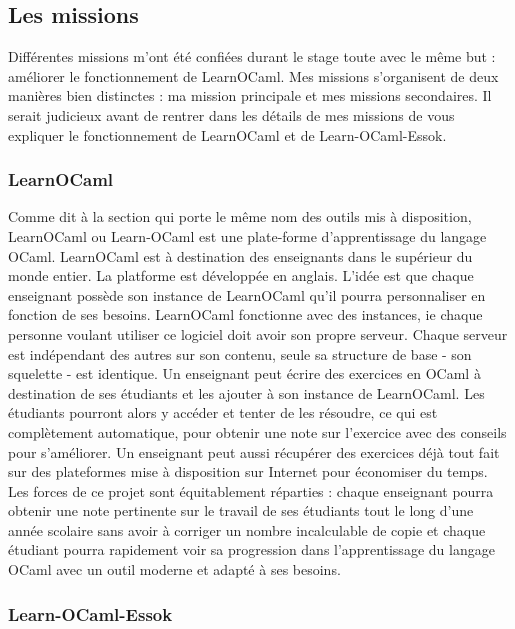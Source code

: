 \documentclass{article}
\begin{document}
\subsection{Les missions}

Différentes missions m'ont été confiées durant le stage toute avec le même but : améliorer le fonctionnement de LearnOCaml.
Mes missions s'organisent de deux manières bien distinctes : ma mission principale et mes missions secondaires.
Il serait judicieux avant de rentrer dans les détails de mes missions de vous expliquer le fonctionnement de LearnOCaml et de Learn-OCaml-Essok.

\subsubsection{LearnOCaml}

Comme dit à la section qui porte le même nom des outils mis à disposition, LearnOCaml ou Learn-OCaml est une plate-forme d’apprentissage du langage OCaml.
LearnOCaml est à destination des enseignants dans le supérieur du monde entier. La platforme est développée en anglais. L'idée est que chaque enseignant possède son instance de LearnOCaml qu'il pourra personnaliser en fonction de ses besoins.
\newline
LearnOCaml fonctionne avec des instances, ie chaque personne voulant utiliser ce logiciel doit avoir son propre serveur. Chaque serveur est indépendant des autres sur son contenu, seule sa structure de base - son squelette - est identique.
\newline
Un enseignant peut écrire des exercices en OCaml à destination de ses étudiants et les ajouter à son instance de LearnOCaml. Les étudiants pourront alors y accéder et tenter de les résoudre, ce qui est complètement automatique, pour obtenir une note sur l'exercice avec des conseils pour s'améliorer.
\newline
Un enseignant peut aussi récupérer des exercices déjà tout fait sur des plateformes mise à disposition sur Internet pour économiser du temps.
\newline
Les forces de ce projet sont équitablement réparties : chaque enseignant pourra obtenir une note pertinente sur le travail de ses étudiants tout le long d'une année scolaire sans avoir à corriger un nombre incalculable de copie et chaque étudiant pourra rapidement voir sa progression dans l'apprentissage du langage OCaml avec un outil moderne et adapté à ses besoins.

\subsubsection{Learn-OCaml-Essok}
\end{document}
